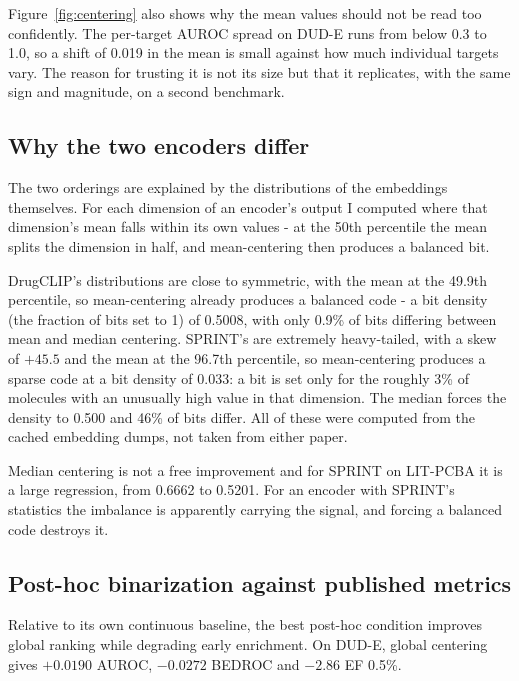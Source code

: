 \documentclass[10pt,a4paper]{article}
\begin{document}
Figure~\ref{fig:centering} also shows why the mean values should not be read too confidently. The per-target
AUROC spread on DUD-E runs from below 0.3 to 1.0, so a shift of 0.019 in the mean is small
against how much individual targets vary. The reason for trusting it is not its size but that
it replicates, with the same sign and magnitude, on a second benchmark.

\subsection{Why the two encoders differ}\label{sec:why-differ}
The two orderings are explained by the distributions of the embeddings themselves. For each
dimension of an encoder's output I computed where that dimension's mean falls within its own
values - at the 50th percentile the mean splits the dimension in half, and mean-centering then
produces a balanced bit.

DrugCLIP's distributions are close to symmetric, with the mean at the 49.9th percentile, so
mean-centering already produces a balanced code - a bit density (the fraction of bits set to
1) of 0.5008, with only 0.9\% of bits differing between mean and median centering. SPRINT's
are extremely heavy-tailed, with a skew of $+45.5$ and the mean at the 96.7th percentile, so
mean-centering produces a sparse code at a bit density of 0.033: a bit is set only for the
roughly 3\% of molecules with an unusually high value in that dimension. The median forces the
density to 0.500 and 46\% of bits differ. All of these were computed from the cached embedding
dumps, not taken from either paper.

Median centering is not a free improvement and for SPRINT on LIT-PCBA it is a large
regression, from 0.6662 to 0.5201. For an encoder with SPRINT's statistics the imbalance is
apparently carrying the signal, and forcing a balanced code destroys it.

\subsection{Post-hoc binarization against published metrics}\label{sec:posthoc}
Relative to its own continuous baseline, the best post-hoc condition improves global ranking
while degrading early enrichment. On DUD-E, global centering gives $+0.0190$ AUROC,
$-0.0272$ BEDROC and $-2.86$ EF 0.5\%.
\end{document}

